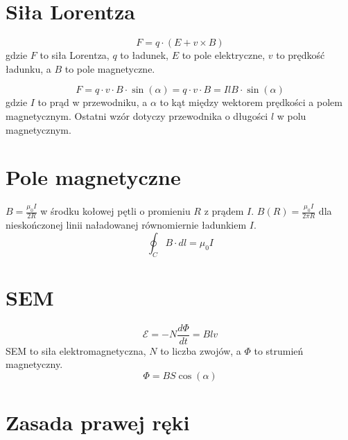 \documentclass{../konspekt}
\begin{document}
\begin{multicols}{2}
  \section{Siła Lorentza}

  $$
  F = q \cdot (E + v \times B)
  $$
  gdzie $F$ to siła Lorentza, $q$ to ładunek, $E$ to pole elektryczne,
  $v$ to prędkość ładunku, a $B$ to pole magnetyczne.

  $$
  F = q \cdot v \cdot B \cdot \sin(\alpha) = q \cdot v \cdot B =
  IlB \cdot \sin(\alpha)
  $$
  gdzie $I$ to prąd w przewodniku,
  a $\alpha$ to kąt między wektorem prędkości a polem magnetycznym.
  Ostatni wzór dotyczy przewodnika o długości $l$ w polu magnetycznym.

  \section{Pole magnetyczne}

  $
  B = \frac{\mu_0 I}{2 R}
  $
  w środku kołowej pętli o promieniu $R$ z prądem $I$.
  $
  B(R) = \frac{\mu_0 I}{2\pi R}
  $
  dla nieskończonej linii naładowanej równomiernie ładunkiem $I$.
  $$
  \oint_{C} B \cdot dl = \mu_0 I
  $$

  \section{SEM}

  $$
  \mathcal{E} = -N \frac{d \Phi}{dt} = Blv
  $$
  SEM to siła elektromagnetyczna, $N$ to liczba zwojów, a $\Phi$
  to strumień magnetyczny.
  $$
  \Phi = BS \cos(\alpha)
  $$

  \section{Zasada prawej ręki}

  \begin{center}
  \end{center}

\end{multicols}
\end{document}
